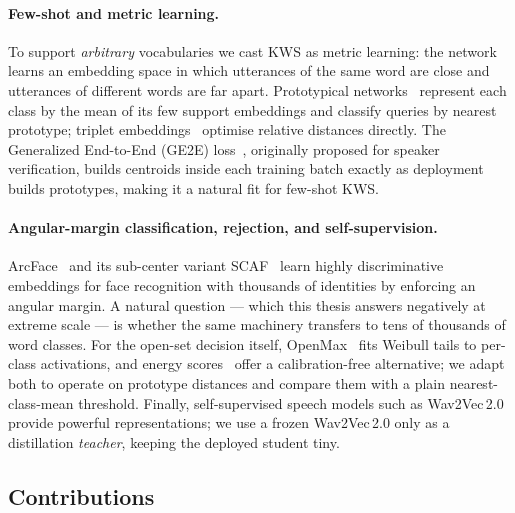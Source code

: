 \documentclass[12pt,a4paper]{article}
\begin{document}
\paragraph{Few-shot and metric learning.}
To support \emph{arbitrary} vocabularies we cast KWS as metric learning: the
network learns an embedding space in which utterances of the same word are close
and utterances of different words are far apart. Prototypical
networks~\cite{snell2017prototypical} represent each class by the mean of its few
support embeddings and classify queries by nearest prototype; triplet
embeddings~\cite{schroff2015facenet} optimise relative distances directly. The
Generalized End-to-End (GE2E) loss~\cite{wan2018ge2e}, originally proposed for
speaker verification, builds centroids inside each training batch exactly as
deployment builds prototypes, making it a natural fit for few-shot KWS.

\paragraph{Angular-margin classification, rejection, and self-supervision.}
ArcFace~\cite{deng2019arcface} and its sub-center variant
SCAF~\cite{deng2020subcenter} learn highly discriminative embeddings for face
recognition with thousands of identities by enforcing an angular margin. A
natural question --- which this thesis answers negatively at extreme scale --- is
whether the same machinery transfers to tens of thousands of word classes. For
the open-set decision itself, OpenMax~\cite{bendale2016openmax} fits Weibull
tails to per-class activations, and energy scores~\cite{liu2020energy} offer a
calibration-free alternative; we adapt both to operate on prototype distances and
compare them with a plain nearest-class-mean threshold. Finally, self-supervised
speech models such as Wav2Vec\,2.0~\cite{baevski2020wav2vec} provide powerful
representations; we use a frozen Wav2Vec\,2.0 only as a distillation
\emph{teacher}, keeping the deployed student tiny.

\subsection{Contributions}\label{sec:contrib}
\end{document}
